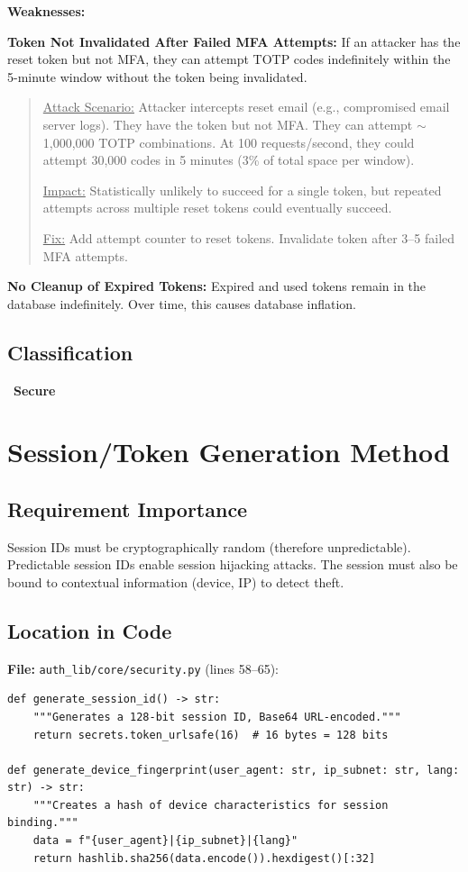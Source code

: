 \documentclass[11pt,a4paper]{article}
\newcommand{\secure}{\textcolor{securegreen}{\checkmark~\textbf{Secure}}}
\begin{document}
\textbf{Weaknesses:}

\textbf{Token Not Invalidated After Failed MFA Attempts:} If an attacker has the reset token but not MFA, they can attempt TOTP codes indefinitely within the 5-minute window without the token being invalidated.

\begin{quote}
\underline{Attack Scenario:} Attacker intercepts reset email (e.g., compromised email server logs). They have the token but not MFA. They can attempt $\sim$1,000,000 TOTP combinations. At 100 requests/second, they could attempt 30,000 codes in 5 minutes (3\% of total space per window).

\underline{Impact:} Statistically unlikely to succeed for a single token, but repeated attempts across multiple reset tokens could eventually succeed.

\underline{Fix:} Add attempt counter to reset tokens. Invalidate token after 3--5 failed MFA attempts.
\end{quote}

\textbf{No Cleanup of Expired Tokens:} Expired and used tokens remain in the database indefinitely. Over time, this causes database inflation.

\subsection{Classification}
\secure

\newpage
\section{Session/Token Generation Method}

\subsection{Requirement Importance}
Session IDs must be cryptographically random (therefore unpredictable). Predictable session IDs enable session hijacking attacks. The session must also be bound to contextual information (device, IP) to detect theft.

\subsection{Location in Code}

\textbf{File:} \texttt{auth\_lib/core/security.py} (lines 58--65):
\begin{lstlisting}
def generate_session_id() -> str:
    """Generates a 128-bit session ID, Base64 URL-encoded."""
    return secrets.token_urlsafe(16)  # 16 bytes = 128 bits

def generate_device_fingerprint(user_agent: str, ip_subnet: str, lang: str) -> str:
    """Creates a hash of device characteristics for session binding."""
    data = f"{user_agent}|{ip_subnet}|{lang}"
    return hashlib.sha256(data.encode()).hexdigest()[:32]
\end{lstlisting}
\end{document}

